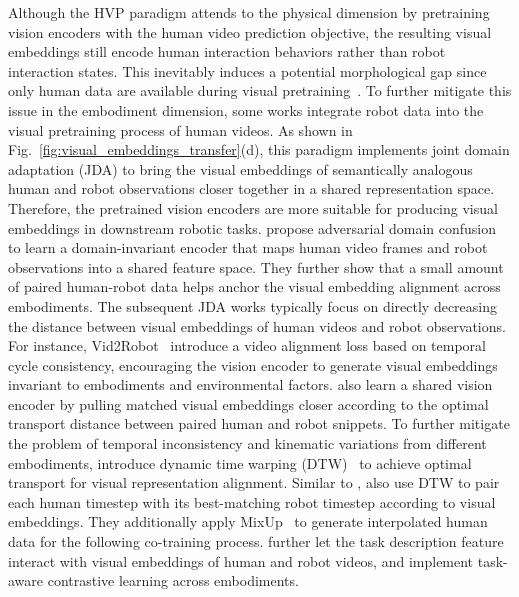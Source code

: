 \documentclass[Afour,sageh,times]{sagej}
\begin{document}
Although the HVP paradigm attends to the physical dimension by pretraining vision encoders with the human video prediction objective, the resulting visual embeddings still encode human interaction behaviors rather than robot interaction states. This inevitably induces a potential morphological gap since only human data are available during visual pretraining~\citep{mower2026robot}. To further mitigate this issue in the embodiment dimension, some works integrate robot data into the visual pretraining process of human videos. As shown in Fig.~\ref{fig:visual_embeddings_transfer}(d), this paradigm implements joint domain adaptation (JDA) to bring the visual embeddings of semantically analogous human and robot observations closer together in a shared representation space. Therefore, the pretrained vision encoders are more suitable for producing visual embeddings in downstream robotic tasks. \cite{schmeckpeper2020reinforcement} propose adversarial domain confusion to learn a domain-invariant encoder that maps human video frames and robot observations into a shared feature space. They further show that a small amount of paired human-robot data helps anchor the visual embedding alignment across embodiments. The subsequent JDA works typically focus on directly decreasing the distance between visual embeddings of human videos and robot observations. For instance, Vid2Robot~\citep{jain2024vid2robot} introduce a video alignment loss based on temporal cycle consistency, encouraging the vision encoder to generate visual embeddings invariant to embodiments and environmental factors. \cite{kedia2025one} also learn a shared vision encoder by pulling matched visual embeddings closer according to the optimal transport distance between paired human and robot snippets. To further mitigate the problem of temporal inconsistency and kinematic variations from different embodiments, \cite{punamiya2025egobridge} introduce dynamic time warping (DTW)~\citep{sakoe1978dynamic} to achieve optimal transport for visual representation alignment. Similar to \cite{punamiya2025egobridge}, \cite{liu2025immimic} also use DTW to pair each human timestep
with its best-matching robot timestep according to visual embeddings. They additionally apply MixUp~\citep{zhang2017mixup} to generate interpolated human data for the following co-training process. \cite{zhou2025mitigating} further let the task description feature interact with visual embeddings of human and robot videos, and implement task-aware contrastive learning across embodiments. 
\end{document}
